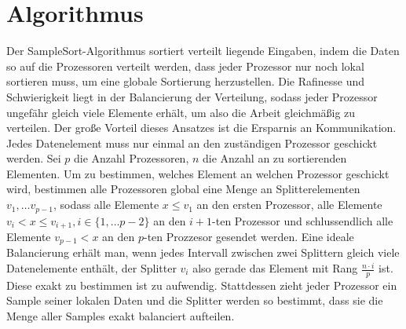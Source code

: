 \documentclass{llncs}
\title{\doctype}
\author{Sebastian Schmidt, Lars Gottesbueren}
\institute{
Karlsruhe Institute of Technology, Karlsruhe, Germany}
\begin{document}

\def\iterationcnt{5}

\maketitle

\begin{abstract}
Evaluate the performance of SampleSort implementation in MPI.
\end{abstract}

\pagestyle{plain}

\section{Algorithmus}
Der SampleSort-Algorithmus sortiert verteilt liegende Eingaben, indem die Daten so auf die Prozessoren verteilt werden, dass jeder Prozessor nur noch lokal sortieren muss, um eine globale Sortierung herzustellen. Die Rafinesse und Schwierigkeit liegt in der Balancierung der Verteilung, sodass jeder Prozessor ungefähr gleich viele Elemente erhält, um also die Arbeit gleichmäßig zu verteilen. Der große Vorteil dieses Ansatzes ist die Ersparnis an Kommunikation. Jedes Datenelement muss nur einmal an den zuständigen Prozessor geschickt werden.
Sei $p$ die Anzahl Prozessoren, $n$ die Anzahl an zu sortierenden Elementen.
Um zu bestimmen, welches Element an welchen Prozessor geschickt wird, bestimmen alle Prozessoren global eine Menge an Splitterelementen $v_1 , \dots v_{p-1}$, sodass alle Elemente $x \leq v_1$ an den ersten Prozessor, alle Elemente $v_i < x \leq v_{i+1}, i \in \{ 1, \dots p-2 \}$ an den $i+1$-ten Prozessor und schlussendlich alle Elemente $v_{p-1} < x$ an den $p$-ten Prozzesor gesendet werden. Eine ideale Balancierung erhält man, wenn jedes Intervall zwischen zwei Splittern gleich viele Datenelemente enthält, der Splitter $v_i$ also gerade das Element mit Rang $\frac{n \cdot i}{p}$ ist. Diese exakt zu bestimmen ist zu aufwendig. Stattdessen zieht jeder Prozessor ein Sample seiner lokalen Daten und die Splitter werden so bestimmt, dass sie die Menge aller Samples exakt balanciert aufteilen.
\end{document}
